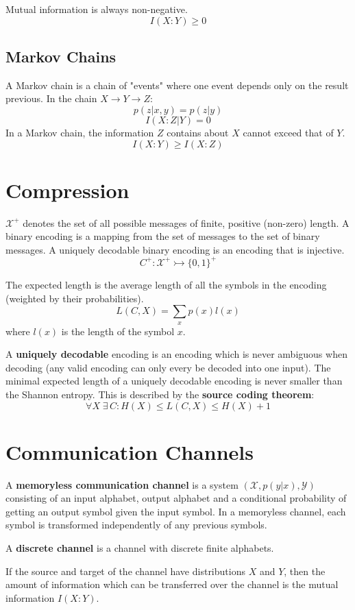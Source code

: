 \documentclass[a4paper,12pt,DIV=calc]{scrartcl}
\begin{document}
Mutual information is always non-negative.
\[I(X:Y) \geq 0\]

\subsection{Markov Chains}
A Markov chain is a chain of "events" where one event depends only on the result
previous. In the chain $X \rightarrow Y \rightarrow Z$:
\[p(z|x,y) = p(z|y)\]
\[I(X:Z|Y) = 0\]
In a Markov chain, the information $Z$ contains about $X$ cannot exceed that of
$Y$.
\[I(X:Y) \geq I(X:Z)\]

\section{Compression}
$\mathcal{X}^+$ denotes the set of all possible messages of finite, positive
(non-zero) length. A binary encoding is a mapping from the set of messages to
the set of binary messages. A uniquely decodable binary encoding is an encoding
that is injective.
\[C^+: \mathcal{X}^+ \rightarrowtail \{0, 1\}^+\]

The expected length is the average length of all the symbols in the encoding
(weighted by their probabilities).
\[L(C,X) = \sum_x p(x)l(x)\]
where $l(x)$ is the length of the symbol $x$.

A \textbf{uniquely decodable} encoding is an encoding which is never ambiguous
when decoding (any valid encoding can only every be decoded into one input). The
minimal expected length of a uniquely decodable encoding is never smaller than
the Shannon entropy. This is described by the \textbf{source coding theorem}:
\[\forall X\;\exists \,C \colon H(X) \leq L(C, X) \leq H(X) + 1\]

\section{Communication Channels}
A \textbf{memoryless communication channel} is a system $(\mathcal{X}, p(y|x),
\mathcal{Y})$ consisting of an input alphabet, output alphabet and a conditional
probability of getting an output symbol given the input symbol. In a memoryless
channel, each symbol is transformed independently of any previous symbols.

A \textbf{discrete channel} is a channel with discrete finite alphabets.

If the source and target of the channel have distributions $X$ and $Y$, then the
amount of information which can be transferred over the channel is the mutual
information $I(X:Y)$.
\end{document}
